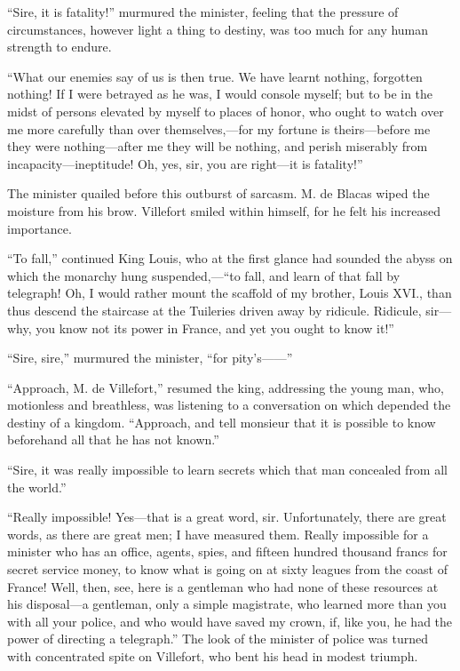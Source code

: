 “Sire, it is fatality!” murmured the minister, feeling that the
pressure of circumstances, however light a thing to destiny, was too
much for any human strength to endure.

“What our enemies say of us is then true. We have learnt nothing,
forgotten nothing! If I were betrayed as he was, I would console
myself; but to be in the midst of persons elevated by myself to places
of honor, who ought to watch over me more carefully than over
themselves,—for my fortune is theirs—before me they were nothing—after
me they will be nothing, and perish miserably from
incapacity—ineptitude! Oh, yes, sir, you are right—it is fatality!”

The minister quailed before this outburst of sarcasm. M. de Blacas
wiped the moisture from his brow. Villefort smiled within himself, for
he felt his increased importance.

“To fall,” continued King Louis, who at the first glance had sounded
the abyss on which the monarchy hung suspended,—“to fall, and learn of
that fall by telegraph! Oh, I would rather mount the scaffold of my
brother, Louis XVI., than thus descend the staircase at the Tuileries
driven away by ridicule. Ridicule, sir—why, you know not its power in
France, and yet you ought to know it!”

“Sire, sire,” murmured the minister, “for pity’s——”

“Approach, M. de Villefort,” resumed the king, addressing the young
man, who, motionless and breathless, was listening to a conversation on
which depended the destiny of a kingdom. “Approach, and tell monsieur
that it is possible to know beforehand all that he has not known.”

“Sire, it was really impossible to learn secrets which that man
concealed from all the world.”

“Really impossible! Yes—that is a great word, sir. Unfortunately, there
are great words, as there are great men; I have measured them. Really
impossible for a minister who has an office, agents, spies, and fifteen
hundred thousand francs for secret service money, to know what is going
on at sixty leagues from the coast of France! Well, then, see, here is
a gentleman who had none of these resources at his disposal—a
gentleman, only a simple magistrate, who learned more than you with all
your police, and who would have saved my crown, if, like you, he had
the power of directing a telegraph.” The look of the minister of police
was turned with concentrated spite on Villefort, who bent his head in
modest triumph.

